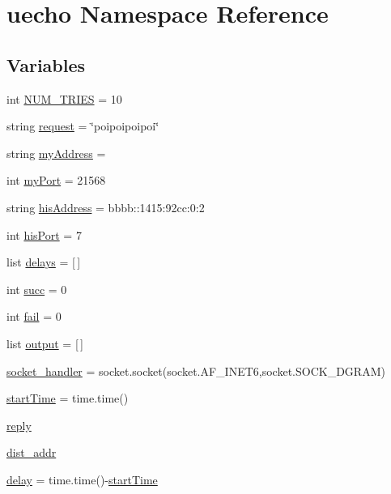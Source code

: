\hypertarget{namespaceuecho}{}\section{uecho Namespace Reference}
\label{namespaceuecho}
\subsection*{Variables}
\begin{DoxyCompactItemize}
\item 
int \hyperlink{namespaceuecho_a76eb795f8c12b741184046c46e54e51e}{N\+U\+M\+\_\+\+T\+R\+I\+ES} = 10
\item 
string \hyperlink{namespaceuecho_afdb3394ff38586a5548fae77f0aa228e}{request} = \char`\"{}poipoipoipoi\char`\"{}
\item 
string \hyperlink{namespaceuecho_a43b6154ddf23a0edde1c7b2220053377}{my\+Address} = \textquotesingle{}\textquotesingle{}
\item 
int \hyperlink{namespaceuecho_ac672349797c2218d1bed91c6a9971bbc}{my\+Port} = 21568
\item 
string \hyperlink{namespaceuecho_a278882dc4c144edce9069b276890d7e4}{his\+Address} = \textquotesingle{}bbbb\+::1415\+:92cc\+:0\+:2\textquotesingle{}
\item 
int \hyperlink{namespaceuecho_a0510f769062a25f06d501c2ddc33d745}{his\+Port} = 7
\item 
list \hyperlink{namespaceuecho_a6644677cc8dc060e9dbed21d5674ff97}{delays} = \mbox{[}$\,$\mbox{]}
\item 
int \hyperlink{namespaceuecho_aaf020131eccfb2e9f2e033da527da698}{succ} = 0
\item 
int \hyperlink{namespaceuecho_ae80421c5c79035c7d49b3c74dd7ff335}{fail} = 0
\item 
list \hyperlink{namespaceuecho_ab51ccd7dd71101925a65714c9b6b3ab5}{output} = \mbox{[}$\,$\mbox{]}
\item 
\hyperlink{namespaceuecho_aa5a95d12013654731fbb8b4470a1c5c3}{socket\+\_\+handler} = socket.\+socket(socket.\+A\+F\+\_\+\+I\+N\+E\+T6,socket.\+S\+O\+C\+K\+\_\+\+D\+G\+R\+AM)
\item 
\hyperlink{namespaceuecho_a871cfa884511be1b39276bbe529f33bc}{start\+Time} = time.\+time()
\item 
\hyperlink{namespaceuecho_a14d3176a6ac905682e83c66c9f1d7126}{reply}
\item 
\hyperlink{namespaceuecho_a92f666ccf7137639b4da6f1f7406671a}{dist\+\_\+addr}
\item 
\hyperlink{namespaceuecho_aa23fa5975707e43123dfed328f1b2b78}{delay} = time.\+time()-\/\hyperlink{namespaceuecho_a871cfa884511be1b39276bbe529f33bc}{start\+Time}
\end{DoxyCompactItemize}



